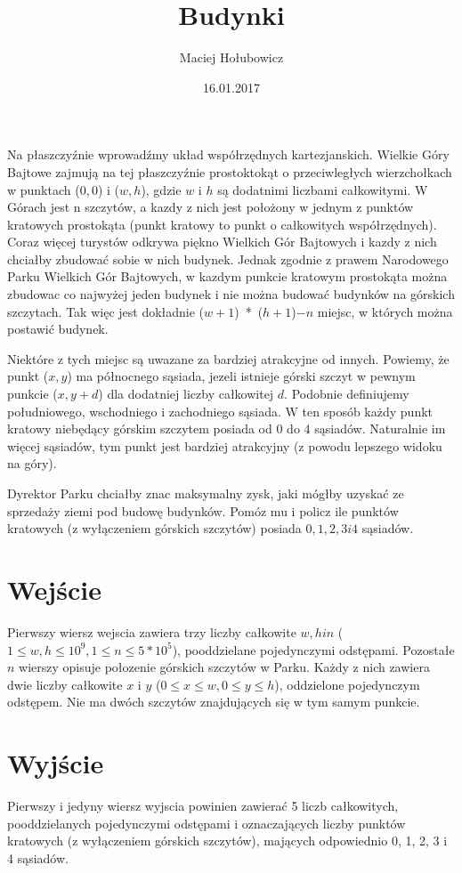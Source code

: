 \documentclass[zad,zawodnik,utf8]{sinol}
\title{Budynki}
\author{Maciej Hołubowicz} %
\date{16.01.2017}
\begin{document}
\begin{tasktext}%

 Na płaszczyźnie wprowadźmy układ współrzędnych kartezjanskich. Wielkie Góry Bajtowe zajmują na tej płaszczyźnie prostoktokąt o przeciwległych wierzchołkach w punktach ($0,0$) i ($w,h$), gdzie $w$ i $h$ są dodatnimi liczbami całkowitymi. W Górach jest n szczytów, a kazdy z nich jest położony w jednym z punktów kratowych prostokąta (punkt kratowy to punkt o całkowitych współrzędnych). Coraz więcej turystów odkrywa piękno Wielkich Gór Bajtowych i kazdy z nich chciałby zbudować sobie w nich budynek. Jednak zgodnie z prawem Narodowego Parku Wielkich Gór Bajtowych, w kazdym punkcie kratowym prostokąta można zbudowac co najwyżej jeden budynek i nie można budować budynków na górskich szczytach. Tak więc jest dokładnie ($w + 1$)~*~($h + 1$)$-n$ miejsc, w których można postawić budynek. 
 
 Niektóre z tych miejsc są uwazane za bardziej atrakcyjne od innych. Powiemy, że punkt ($x,y$) ma północnego sąsiada, jezeli istnieje górski szczyt w pewnym punkcie ($x,y + d$) dla dodatniej liczby całkowitej $d$. Podobnie definiujemy południowego, wschodniego i zachodniego sąsiada. W ten sposób każdy punkt kratowy niebędący górskim szczytem posiada od 0 do 4 sąsiadów. Naturalnie im więcej sąsiadów, tym punkt jest bardziej atrakcyjny (z powodu lepszego widoku na góry). 

Dyrektor Parku chciałby znac maksymalny zysk, jaki mógłby uzyskać ze sprzedaży ziemi pod budowę budynków. Pomóz mu i policz ile punktów kratowych (z wyłączeniem górskich szczytów) posiada $0, 1, 2, 3 i 4$ sąsiadów.

  \section{Wejście}
Pierwszy wiersz wejscia zawiera trzy liczby całkowite $w, h i n$ ($1 \le w,h \le 10^9, 1 \le n \le 5 * 10 ^ 5$), pooddzielane pojedynczymi odstępami. Pozostałe $n$ wierszy opisuje połozenie górskich szczytów w Parku. Każdy z nich zawiera dwie liczby całkowite $x$ i $y$ ($0 \le x \le w, 0 \le y \le h$), oddzielone pojedynczym odstępem. Nie ma dwóch szczytów znajdujących się w tym samym punkcie.

 \section{Wyjście}
Pierwszy i jedyny wiersz wyjscia powinien zawierać 5 liczb całkowitych, pooddzielanych pojedynczymi odstępami i oznaczających liczby punktów kratowych (z wyłączeniem górskich szczytów), mających odpowiednio 0, 1, 2, 3 i 4 sąsiadów.

\makecompactexample

\end{tasktext}
\end{document}
